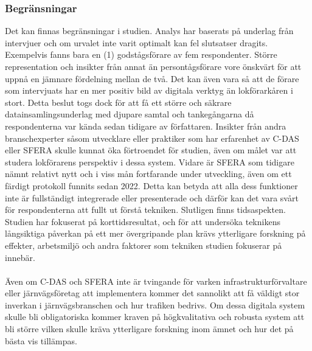 \subsubsection{Begränsningar}
Det kan finnas begränsningar i studien.
Analys har baserats på underlag från intervjuer och om urvalet inte varit optimalt kan fel slutsatser dragits.
Exempelvis fanns bara en (1) godstågsförare av fem respondenter.
Större representation och insikter från annat än persontågsförare vore önskvärt för att uppnå en jämnare fördelning mellan de två.
Det kan även vara så att de förare som intervjuats har en mer positiv bild av digitala verktyg än lokförarkåren i stort.
Detta beslut togs dock för att få ett större och säkrare datainsamlingsunderlag med djupare samtal och tankegångarna då respondenterna var kända sedan tidigare av författaren.
Insikter från andra branschexperter såsom utvecklare eller praktiker som har erfarenhet av C-DAS eller SFERA skulle kunnat öka förtroendet för studien, även om målet var att studera lokförarens perspektiv i dessa system.
Vidare är SFERA som tidigare nämnt relativt nytt och i viss mån fortfarande under utveckling, även om ett färdigt protokoll funnits sedan 2022.
Detta kan betyda att alla dess funktioner inte är fullständigt integrerade eller presenterade och därför kan det vara svårt för respondenterna att fullt ut förstå tekniken.
Slutligen finns tidsaspekten.
Studien har fokuserat på korttidsresultat, och för att undersöka teknikens långsiktiga påverkan på ett mer övergripande plan krävs ytterligare forskning på effekter, arbetsmiljö och andra faktorer som tekniken studien fokuserar på innebär.
\paragraph{}
\hspace{-15pt}
Även om C-DAS och SFERA inte är tvingande för varken infrastrukturförvaltare eller järnvägsföretag att implementera kommer det sannolikt att få väldigt stor inverkan i järnvägsbranschen och hur trafiken bedrivs.
Om dessa digitala system skulle bli obligatoriska kommer kraven på högkvalitativa och robusta system att bli större vilken skulle kräva ytterligare forskning inom ämnet och hur det på bästa vis tillämpas.